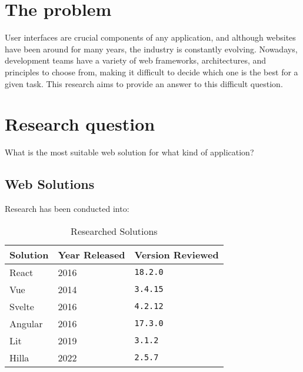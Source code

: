 \section{The problem}

User interfaces are crucial components of any application, and although websites have been around for many years, the industry is constantly evolving. Nowadays, development teams have a variety of web frameworks, architectures, and principles to choose from, making it difficult to decide which one is the best for a given task. This research aims to provide an answer to this difficult question.

\section{Research question}

What is the most suitable web solution for what kind of application?

\subsection{Web Solutions}
\label{subsec:intro:research:web_solutions}

Research has been conducted into:

\begin{table}[H]
    \centering
    \begin{tabular}{|l|l|l|}
        \hline
        Solution & Year Released & Version Reviewed \\
        \hline
        React    & 2016          & \texttt{18.2.0}  \\ \hline
        Vue      & 2014          & \texttt{3.4.15}  \\ \hline
        Svelte   & 2016          & \texttt{4.2.12}  \\ \hline
        Angular  & 2016          & \texttt{17.3.0}  \\ \hline
        Lit      & 2019          & \texttt{3.1.2}   \\ \hline
        Hilla    & 2022          & \texttt{2.5.7}   \\ \hline
    \end{tabular}
    \caption{Researched Solutions}
    \label{tab:researched_solutions}
\end{table}

